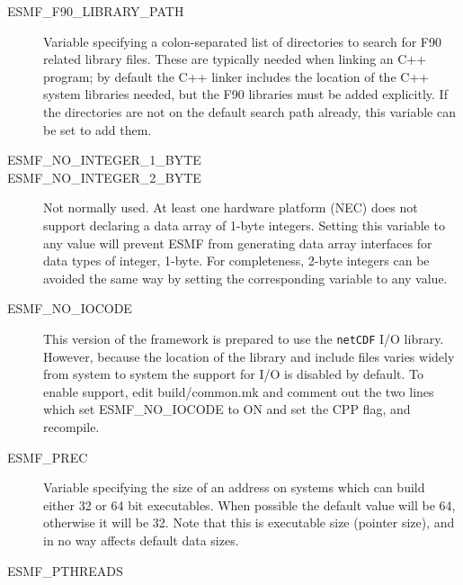 \begin{description}
\item[ESMF\_F90\_LIBRARY\_PATH]

Variable specifying a colon-separated list of directories to
search for F90 related library files.  These are typically needed
when linking an C++ program; by default the C++ linker includes
the location of the C++ system libraries needed, but the F90 libraries
must be added explicitly.  If the directories are not on the
default search path already, this variable can be set to add them.

\item[ESMF\_NO\_INTEGER\_1\_BYTE] 
\item[ESMF\_NO\_INTEGER\_2\_BYTE] 

Not normally used.  At least one hardware platform (NEC) does not support
declaring a data array of 1-byte integers.  Setting this variable to any
value will prevent ESMF from generating data array interfaces for data types
of integer, 1-byte.  For completeness, 2-byte integers can be avoided the
same way by setting the corresponding variable to any value.

\item[ESMF\_NO\_IOCODE] 

This version of the framework is prepared to use the {\tt netCDF} I/O
library.  However, because the location of the library and include files
varies widely from system to system the support for I/O is disabled by
default.  To enable support, edit build/common.mk and comment out the two
lines which set ESMF\_NO\_IOCODE to ON and set the CPP flag, and recompile.

\item[ESMF\_PREC] 

Variable specifying the size of an address on systems which can build
either 32 or 64 bit executables.  When possible the default value will be
64, otherwise it will be 32.  Note that this is executable size (pointer
size), and in no way affects default data sizes.

\item[ESMF\_PTHREADS]


\end{description}
